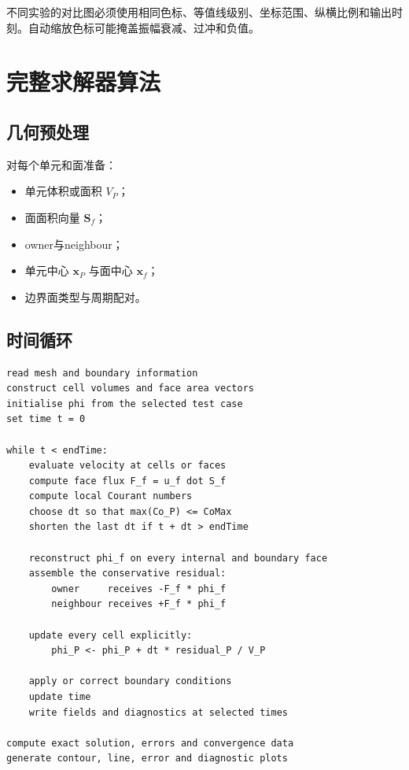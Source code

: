 \documentclass[UTF8,12pt,a4paper,fontset=fandol]{ctexart}
\numberwithin{equation}{section}
\newcommand{\Sf}{\bm S}
\newcommand{\xf}{\bm x}
\begin{document}
不同实验的对比图必须使用相同色标、等值线级别、坐标范围、纵横比例和输出时刻。自动缩放色标可能掩盖振幅衰减、过冲和负值。

\section{完整求解器算法}

\subsection{几何预处理}

对每个单元和面准备：

\begin{itemize}
  \item 单元体积或面积 $V_P$；
  \item 面面积向量 $\Sf_f$；
  \item owner与neighbour；
  \item 单元中心 $\xf_P$ 与面中心 $\xf_f$；
  \item 边界面类型与周期配对。
\end{itemize}

\subsection{时间循环}

\begin{lstlisting}[style=algorithm]
read mesh and boundary information
construct cell volumes and face area vectors
initialise phi from the selected test case
set time t = 0

while t < endTime:
    evaluate velocity at cells or faces
    compute face flux F_f = u_f dot S_f
    compute local Courant numbers
    choose dt so that max(Co_P) <= CoMax
    shorten the last dt if t + dt > endTime

    reconstruct phi_f on every internal and boundary face
    assemble the conservative residual:
        owner     receives -F_f * phi_f
        neighbour receives +F_f * phi_f

    update every cell explicitly:
        phi_P <- phi_P + dt * residual_P / V_P

    apply or correct boundary conditions
    update time
    write fields and diagnostics at selected times

compute exact solution, errors and convergence data
generate contour, line, error and diagnostic plots
\end{lstlisting}
\end{document}
